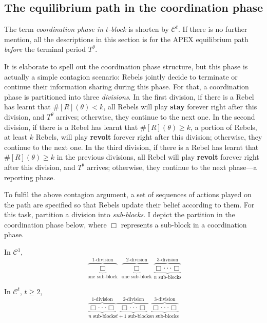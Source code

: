 \documentclass[12pt,letter]{article}
\newcommand{\Kappa}{\mathcal{C}}
\theoremstyle{definition}
\theoremstyle{remark}
\theoremstyle{claim}
\begin{document}
\subsection{The equilibrium path in the coordination phase}
\label{sec:eq_cd}
The term \textit{coordination phase in $t$-block} is shorten by $\Kappa^{t}$. If there is no further mention, all the descriptions in this section is for the APEX equilibrium path \textit{before} the terminal period $T^{\theta}$. 

It is elaborate to spell out the coordination phase structure, but this phase is actually a simple contagion scenario: Rebels jointly decide to terminate or continue their information sharing during this phase. For that, a coordination phase is partitioned into three \textit{divisions}. In the first division, if there is a Rebel has learnt that $\#[R](\theta)<k$, all Rebels will play \textbf{stay} forever right after this division, and $T^{\theta}$ arrives; otherwise, they continue to the next one. In the second division, if there is a Rebel has learnt that $\#[R](\theta)\geq k$, a portion of Rebels, at least $k$ Rebels, will play \textbf{revolt} forever right after this division; otherwise, they continue to the next one. In the third division, if there is a Rebel has learnt that $\#[R](\theta)\geq k$ in the previous divisions, all Rebel will play \textbf{revolt} forever right after this division, and $T^{\theta}$ arrives; otherwise, they continue to the next phase---a reporting phase.

To fulfil the above contagion argument, a set of sequences of actions played on the path are specified so that Rebels update their belief according to them. For this task, partition a division into \textit{sub-blocks}. I depict the partition in the coordination phase below, where $\Box$ represents a sub-block in a coordination phase. 

In $\Kappa^1$, 
\[\overbrace{\underbrace{ \Box }_{\text{one sub-block}}}^{\text{$1$-division}} \overbrace{\underbrace{\Box }_{\text{one sub-block}}}^{\text{$2$-division}} \overbrace{\underbrace{\Box \cdot \cdot \cdot \Box}_{\text{$n$ sub-blocks}}}^{\text{$3$-division}}\] 

In $\Kappa^t$, $t\geq 2$,
\[\overbrace{\underbrace{\Box \cdot \cdot \cdot \Box}_{\text{$n$ sub-blocks}}}^{\text{$1$-division}} \overbrace{\underbrace{\Box \cdot \cdot \cdot \Box}_{\text{$t+1$ sub-blocks}} }^{\text{$2$-division}} \overbrace{\underbrace{\Box \cdot \cdot \cdot \Box}_{\text{$n$ sub-blocks}}}^{\text{$3$-division}}\] 
\end{document}
